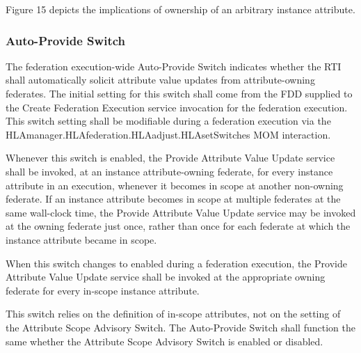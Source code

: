 \clearpage

\begin{compactstdpage}

    Figure 15 depicts the implications of ownership of an arbitrary instance attribute.

    \par\vspace*{386.6pt}

    \subsubsection{Auto-Provide Switch}


    The federation execution-wide Auto-Provide Switch indicates whether the RTI shall automatically solicit attribute value updates from attribute-owning federates. The initial setting for this switch shall come from the FDD supplied to the Create Federation Execution service invocation for the federation execution. This switch setting shall be modifiable during a federation execution via the HLAmanager.HLAfederation.HLAadjust.HLAsetSwitches MOM interaction.


    Whenever this switch is enabled, the Provide Attribute Value Update \rtiinitiated{} service shall be invoked, at an instance attribute-owning federate, for every instance attribute in an execution, whenever it becomes in scope at another non-owning federate. If an instance attribute becomes in scope at multiple federates at the same wall-clock time, the Provide Attribute Value Update \rtiinitiated{} service may be invoked at the owning federate just once, rather than once for each federate at which the instance attribute became in scope.


    When this switch changes to enabled during a federation execution, the Provide Attribute Value Update \rtiinitiated{} service shall be invoked at the appropriate owning federate for every in-scope instance attribute.


    This switch relies on the definition of in-scope attributes, not on the setting of the Attribute Scope Advisory Switch. The Auto-Provide Switch shall function the same whether the Attribute Scope Advisory Switch is enabled or disabled.

\end{compactstdpage}

